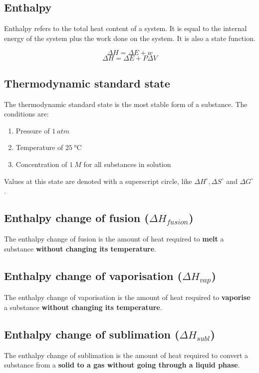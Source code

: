 \documentclass[11pt]{article}
\begin{document}
\subsection{Enthalpy}
\label{sec:orgbe1a231}
Enthalpy refers to the total heat content of a system. It is equal to the internal energy of the system plus the work done on the system. It is also a state function.

\[\Delta H = \Delta E + w\]
\[\Delta H = \Delta E + P \Delta V\]

\newpage

\subsection{Thermodynamic standard state}
\label{sec:orga78b518}
The thermodynamic standard state is the most stable form of a substance. The conditions are:
\begin{enumerate}
\item Pressure of \(\qty{1}{\unit{atm}}\)
\item Temperature of \(\qty{25}{\unit{\degreeCelsius}}\)
\item Concentration of \(\qty{1}{\unit{M}}\) for all substances in solution
\end{enumerate}

Values at this state are denoted with a superscript circle, like \(\Delta H^\circ, \Delta S^\circ\) and \(\Delta G^\circ\).

\subsection{Enthalpy change of fusion (\(\Delta H_{fusion}\))}
\label{sec:org057dae0}
The enthalpy change of fusion is the amount of heat required to \textbf{melt} a substance \textbf{without changing its temperature}.

\subsection{Enthalpy change of vaporisation (\(\Delta H_{vap}\))}
\label{sec:org9b09ea7}
The enthalpy change of vaporisation is the amount of heat required to \textbf{vaporise} a substance \textbf{without changing its temperature}.

\subsection{Enthalpy change of sublimation (\(\Delta H_{subl}\))}
\label{sec:orgd4652ac}
The enthalpy change of sublimation is the amount of heat required to convert a substance from a \textbf{solid to a gas without going through a liquid phase}.
\\[0pt]
\end{document}
